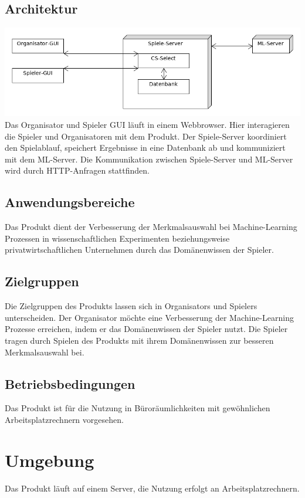 \documentclass[a4paper]{scrreprt}
\begin{document}
    \section{Architektur}
    \includegraphics[width=\textwidth]{uml/export/Architektur.png}
    Das Organisator und Spieler GUI läuft in einem Webbrowser. Hier interagieren die Spieler und Organisatoren mit dem \Gls{Produkt}. Der \Gls{Spiele-Server} koordiniert den Spielablauf, speichert Ergebnisse
    in eine Datenbank ab und kommuniziert mit dem ML-Server. Die Kommunikation zwischen Spiele-Server und ML-Server wird durch HTTP-Anfragen stattfinden.
    \section{Anwendungsbereiche}
    Das \Gls{Produkt} dient der Verbesserung der Merkmalsauswahl bei Machine-Learning Prozessen in wissenschaftlichen
    Experimenten beziehungsweise privatwirtschaftlichen Unternehmen durch das Domänenwissen der \Gls{Spieler}.

    \section{Zielgruppen}
    Die Zielgruppen des \Gls{Produkt}s lassen sich in \Glspl{Organisator} und \Glspl{Spieler} unterscheiden.
    Der Organisator möchte eine Verbesserung der Machine-Learning Prozesse erreichen, indem er das Domänenwissen der Spieler nutzt.
    Die Spieler tragen durch Spielen des \Gls{Produkt}s mit ihrem Domänenwissen zur besseren Merkmalsauswahl bei.

    \section{Betriebsbedingungen}
    Das \Gls{Produkt} ist für die Nutzung in Büroräumlichkeiten mit gewöhnlichen Arbeitsplatzrechnern vorgesehen.

    \chapter{Umgebung}
    Das \Gls{Produkt} läuft auf einem Server, die Nutzung erfolgt an Arbeitsplatzrechnern.
\end{document}
